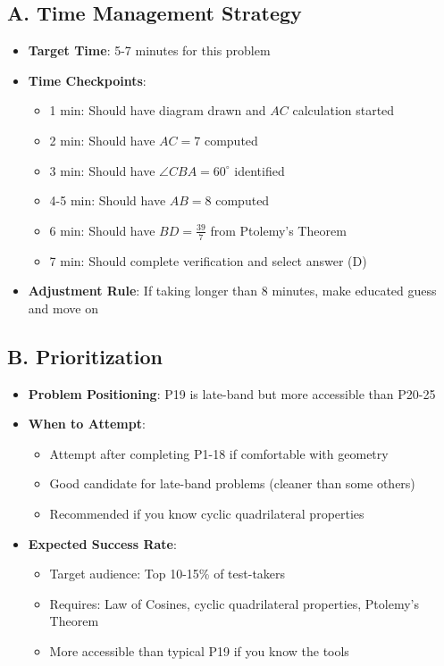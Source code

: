 \documentclass[11pt]{article}
\begin{document}
\begin{competitionbox}
\subsection*{A. Time Management Strategy}
\begin{itemize}[leftmargin=*]
    \item \textbf{Target Time}: 5-7 minutes for this problem
    \item \textbf{Time Checkpoints}:
    \begin{itemize}
        \item 1 min: Should have diagram drawn and $AC$ calculation started
        \item 2 min: Should have $AC = 7$ computed
        \item 3 min: Should have $\angle CBA = 60^\circ$ identified
        \item 4-5 min: Should have $AB = 8$ computed
        \item 6 min: Should have $BD = \frac{39}{7}$ from Ptolemy's Theorem
        \item 7 min: Should complete verification and select answer (D)
    \end{itemize}
    \item \textbf{Adjustment Rule}: If taking longer than 8 minutes, make educated guess and move on
\end{itemize}

\subsection*{B. Prioritization}
\begin{itemize}[leftmargin=*]
    \item \textbf{Problem Positioning}: P19 is late-band but more accessible than P20-25
    \item \textbf{When to Attempt}: 
    \begin{itemize}
        \item Attempt after completing P1-18 if comfortable with geometry
        \item Good candidate for late-band problems (cleaner than some others)
        \item Recommended if you know cyclic quadrilateral properties
    \end{itemize}
    \item \textbf{Expected Success Rate}: 
    \begin{itemize}
        \item Target audience: Top 10-15\% of test-takers
        \item Requires: Law of Cosines, cyclic quadrilateral properties, Ptolemy's Theorem
        \item More accessible than typical P19 if you know the tools
    \end{itemize}
\end{itemize}


\end{competitionbox}
\end{document}
